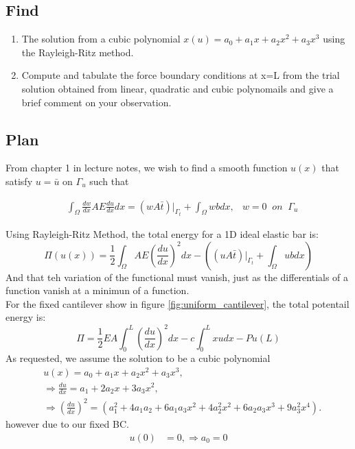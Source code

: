 \documentclass[a4paper]{memoir}
\begin{document}
\subsection{Find}
\begin{enumerate}
	\item The solution from a cubic polynomial $x(u) = a_0+a_1x+a_2x^2+a_3x^3$ using the Rayleigh-Ritz method.
	\item Compute and tabulate the force boundary conditions at x=L from the trial solution obtained from linear, quadratic and cubic polynomails and give a brief comment on your observation.
\end{enumerate}

\subsection{Plan}
From chapter 1 in lecture notes, we wish to find a smooth function $u(x)$ that satisfy $u = \bar{u}$ on $\Gamma_u$ such that

\begin{align*}
	&\int_\Omega \frac{dw}{dx} AE \frac{du}{dx} dx = (wA\bar{t})|_{\Gamma_t} + \int_\Omega wb dx,  & w = 0 \;\; on \;\; \Gamma_u
\end{align*}

Using Rayleigh-Ritz Method, the total energy for a 1D ideal elastic bar is:
\begin{equation}
	\Pi(u(x)) = \frac{1}{2} \int_\Omega AE \left( \frac{du}{dx} \right)^2 dx-\left( (uA\bar{t})|_{\Gamma_t} + \int_\Omega ub dx \right)
\end{equation}
And that teh variation of the functional must vanish, just as the differentials of a function vanish at a minimun of a function. \\
For the fixed cantilever show in figure \ref{fig:uniform_cantilever}, the total potentail energy is:
\begin{equation}
	\Pi = \frac{1}{2} EA \int^L_0 \left( \frac{du}{dx} \right)^2 dx - c \int^L_0 xudx - Pu(L)
	\label{eq:ubeam_potencial_energy}
\end{equation}
As requested, we assume the solution to be a cubic polynomial
\begin{align*}
	 & u(x) = a_0+a_1x+a_2x^2+a_3x^3,\\ & \Rightarrow \frac{du}{dx} = a_1+2a_2x+3a_3x^2, \\
	 & \Rightarrow \left( \frac{du}{dx} \right)^2 = (a_1^2+4a_1a_2+6a_1a_3x^2+4a_2^2x^2+6a_2a_3x^3+9a_3^2x^4).
\end{align*}
however due to our fixed BC.
\begin{align*}
	 u(0) &= 0, \Rightarrow  a_0 = 0
\end{align*}
\end{document}
